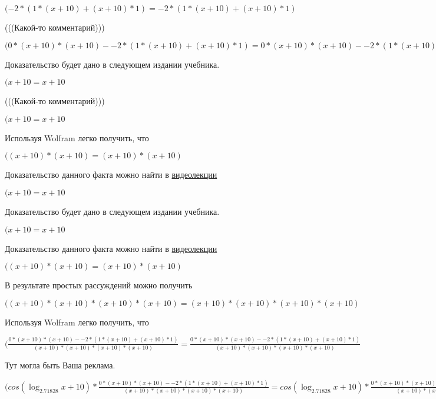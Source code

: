\documentclass[12pt,a4paper,fleqn]{article}
\theoremstyle{definition}
\begin{document}
$( -2  * ( 1  * ( x  +  10 ) + ( x  +  10 ) *  1 ) =  -2  * ( 1  * ( x  +  10 ) + ( x  +  10 ) *  1 )$

(((Какой-то комментарий)))

$( 0  * ( x  +  10 ) * ( x  +  10 ) -  -2  * ( 1  * ( x  +  10 ) + ( x  +  10 ) *  1 ) =  0  * ( x  +  10 ) * ( x  +  10 ) -  -2  * ( 1  * ( x  +  10 ) + ( x  +  10 ) *  1 )$

Доказательство будет дано в следующем издании учебника.

$( x  +  10  =  x  +  10 $

(((Какой-то комментарий)))

$( x  +  10  =  x  +  10 $

Используя Wolfram легко получить, что

$(( x  +  10 ) * ( x  +  10 ) = ( x  +  10 ) * ( x  +  10 )$

Доказательство данного факта можно найти в \href{https://www.youtube.com/watch?v=dQw4w9WgXcQ}{видеолекции}

$( x  +  10  =  x  +  10 $

Доказательство будет дано в следующем издании учебника.

$( x  +  10  =  x  +  10 $

Доказательство данного факта можно найти в \href{https://www.youtube.com/watch?v=dQw4w9WgXcQ}{видеолекции}

$(( x  +  10 ) * ( x  +  10 ) = ( x  +  10 ) * ( x  +  10 )$

В результате простых рассуждений можно получить

$(( x  +  10 ) * ( x  +  10 ) * ( x  +  10 ) * ( x  +  10 ) = ( x  +  10 ) * ( x  +  10 ) * ( x  +  10 ) * ( x  +  10 )$

Используя Wolfram легко получить, что

$(\frac{ 0  * ( x  +  10 ) * ( x  +  10 ) -  -2  * ( 1  * ( x  +  10 ) + ( x  +  10 ) *  1 )}{( x  +  10 ) * ( x  +  10 ) * ( x  +  10 ) * ( x  +  10 )}
 = \frac{ 0  * ( x  +  10 ) * ( x  +  10 ) -  -2  * ( 1  * ( x  +  10 ) + ( x  +  10 ) *  1 )}{( x  +  10 ) * ( x  +  10 ) * ( x  +  10 ) * ( x  +  10 )}
$

Тут могла быть Ваша реклама.

$(cos(\log_{ 2.71828 }{ x  +  10 }) * \frac{ 0  * ( x  +  10 ) * ( x  +  10 ) -  -2  * ( 1  * ( x  +  10 ) + ( x  +  10 ) *  1 )}{( x  +  10 ) * ( x  +  10 ) * ( x  +  10 ) * ( x  +  10 )}
 = cos(\log_{ 2.71828 }{ x  +  10 }) * \frac{ 0  * ( x  +  10 ) * ( x  +  10 ) -  -2  * ( 1  * ( x  +  10 ) + ( x  +  10 ) *  1 )}{( x  +  10 ) * ( x  +  10 ) * ( x  +  10 ) * ( x  +  10 )}
$
\end{document}

